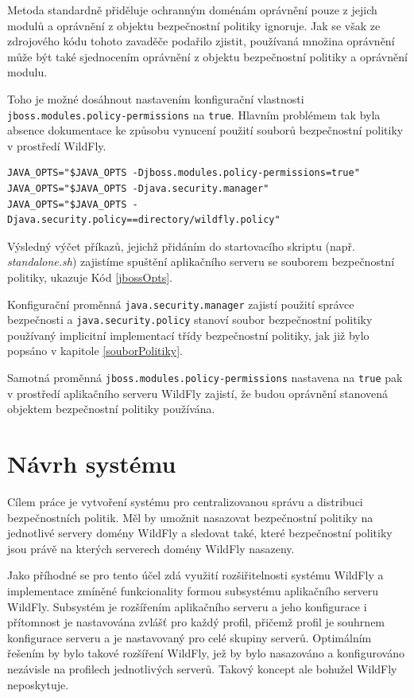 Metoda standardně přiděluje ochranným doménám oprávnění pouze z jejich modulů a oprávnění z objektu bezpečnostní politiky ignoruje. Jak se však ze zdrojového kódu tohoto zavaděče podařilo zjistit, používaná množina oprávnění může být také sjednocením oprávnění z objektu bezpečnostní politiky a oprávnění modulu.

Toho je možné dosáhnout nastavením konfigurační vlastnosti {\tt jboss.modules.policy-permissions} na {\tt true}. Hlavním problémem tak byla absence dokumentace ke způsobu vynucení použití souborů bezpečnostní politiky v prostředí WildFly.

\begin{lstlisting}[caption=Způsob nastavení spuštění aplikačního serveru se souborem bezpečnostní politiky, label=jbossOpts]
JAVA_OPTS="$JAVA_OPTS -Djboss.modules.policy-permissions=true"
JAVA_OPTS="$JAVA_OPTS -Djava.security.manager"
JAVA_OPTS="$JAVA_OPTS -Djava.security.policy==directory/wildfly.policy"
\end{lstlisting}

Výsledný výčet příkazů, jejichž přidáním do startovacího skriptu (např. {\it standalone.sh}) zajistíme spuštění aplikačního serveru se souborem bezpečnostní politiky, ukazuje Kód \ref{jbossOpts}.

Konfigurační proměnná {\tt java.security.manager} zajistí použití správce bezpečnosti a {\tt java.security.policy} stanoví soubor bezpečnostní politiky používaný implicitní implementací třídy bezpečnostní politiky, jak již bylo popsáno v kapitole \ref{souborPolitiky}.

Samotná proměnná {\tt jboss.modules.policy-permissions} nastavena na {\tt true} pak v prostředí aplikačního serveru WildFly zajistí, že budou oprávnění stanovená objektem bezpečnostní politiky používána.

\chapter{Návrh systému}

Cílem práce je vytvoření systému pro centralizovanou správu a distribuci bezpečnostních politik. Měl by umožnit nasazovat bezpečnostní politiky na jednotlivé servery domény WildFly a sledovat také, které bezpečnostní politiky jsou právě na kterých serverech domény WildFly nasazeny.

Jako příhodné se pro tento účel zdá využití rozšiřitelnosti systému WildFly a implementace zmíněné funkcionality formou subsystému aplikačního serveru WildFly. Subsystém je rozšířením aplikačního serveru a jeho konfigurace i přítomnost je nastavována zvlášť pro každý profil, přičemž profil je souhrnem konfigurace serveru a je nastavovaný pro celé skupiny serverů. Optimálním řešením by bylo takové rozšíření WildFly, jež by bylo nasazováno a konfigurováno nezávisle na profilech jednotlivých serverů. Takový koncept ale bohužel WildFly neposkytuje.

